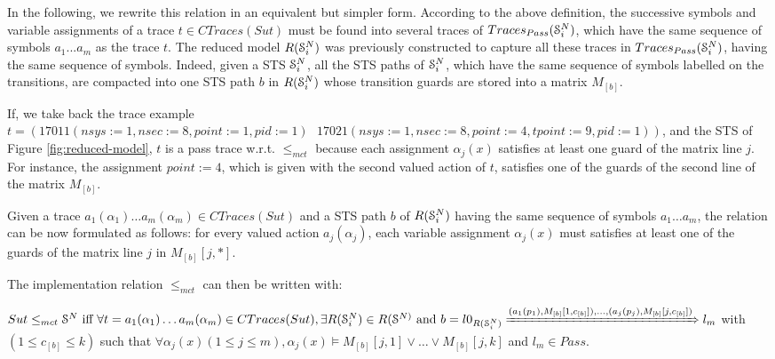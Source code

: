 In the following, we rewrite this relation in an equivalent but
simpler form. According to the above definition, the successive
symbols and variable assignments of a trace $t \in
CTraces({Sut})$ must be found into several traces of
$Traces_{Pass}(\EuScript{S}_i^{N})$, which have the same sequence
of symbols $a_1...a_m$ as the trace $t$. The reduced model
$R(\EuScript{S}_i^{N})$ was previously constructed to capture
all these traces in $Traces_{Pass}(\EuScript{S}_i^{N})$, having
the same sequence of symbols. Indeed, given a STS
$\EuScript{S}_i^{N}$, all the STS paths of $\EuScript{S}_i^{N}$,
which have the same sequence of symbols labelled on the
transitions, are compacted into one STS path $b$ in
$R(\EuScript{S}_i^{N})$ whose transition guards are stored into a
matrix $M_{[b]}$.

If, we take back the trace example
$t=(17011(nsys:=1,nsec:=8,point:=1,pid:=1)\text{ }
17021(nsys:=1,nsec:=8,point:=4,tpoint:=9,pid:=1))$, and the STS of
Figure \ref{fig:reduced-model}, $t$ is a pass trace w.r.t.
$\leq_{mct}$ because each assignment $\alpha_j(x)$ satisfies at
least one guard of the matrix line $j$. For instance, the
assignment $point:=4$, which is given with the second valued
action of $t$, satisfies one of the guards of the second line of
the matrix $M_{[b]}$.

Given a trace $a_1(\alpha_1) \dots a_m(\alpha_m) \in CTraces({Sut})$
and a STS path $b$ of $R(\EuScript{S}_i^{N})$ having the same
sequence of symbols $a_1 \dots a_m$, the relation can be now
formulated as follows: for every valued action $a_j(\alpha_j)$,
each variable assignment $\alpha_j(x)$ must satisfies at least
one of the guards of the matrix line $j$ in $M_{[b]}[j,*]$.

The implementation relation $\leq_{mct}$ can then be written with:

\begin{proposition}
	${Sut} \leq_{mct} \EuScript{S}^{N} \text{ iff } \forall t=
	a_1(\alpha_1) \dots a_m(\alpha_m) \in CTraces({Sut}), \exists
	R(\EuScript{S}_i^{N}) \in R(\EuScript{S}^{N)} \text{ and }
	b=l0_{R(\EuScript{S}_i^{N})} \xRightarrow{(a_1(p_1),M_{[b]}[1,c_{[b]}]),\dots,(a_j(p_j),M_{[b]}[j,c_{[b]}])} l_m$ with $(1 \leq c_{[b]} \leq k)$ such that $\forall \alpha_j(x) (1 \leq j \leq m), \alpha_j(x) \models M_{[b]}[j,1] \vee \dots \vee  M_{[b]}[j,k]$ and $l_m \in Pass$.
\end{proposition}

